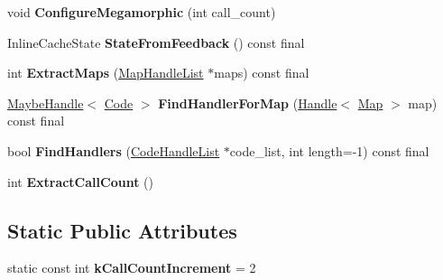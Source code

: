 \begin{DoxyCompactItemize}
\item 
void {\bfseries Configure\+Megamorphic} (int call\+\_\+count)\hypertarget{classv8_1_1internal_1_1_call_i_c_nexus_af9b256e019caf4a405ef70cb27cb5c15}{}\label{classv8_1_1internal_1_1_call_i_c_nexus_af9b256e019caf4a405ef70cb27cb5c15}

\item 
Inline\+Cache\+State {\bfseries State\+From\+Feedback} () const  final\hypertarget{classv8_1_1internal_1_1_call_i_c_nexus_ad3475d632b79276ed1a408a57fc7f2ab}{}\label{classv8_1_1internal_1_1_call_i_c_nexus_ad3475d632b79276ed1a408a57fc7f2ab}

\item 
int {\bfseries Extract\+Maps} (\hyperlink{classv8_1_1internal_1_1_list}{Map\+Handle\+List} $\ast$maps) const  final\hypertarget{classv8_1_1internal_1_1_call_i_c_nexus_aba1dd8999ca0e6ec930b34c81f280efa}{}\label{classv8_1_1internal_1_1_call_i_c_nexus_aba1dd8999ca0e6ec930b34c81f280efa}

\item 
\hyperlink{classv8_1_1internal_1_1_maybe_handle}{Maybe\+Handle}$<$ \hyperlink{classv8_1_1internal_1_1_code}{Code} $>$ {\bfseries Find\+Handler\+For\+Map} (\hyperlink{classv8_1_1internal_1_1_handle}{Handle}$<$ \hyperlink{classv8_1_1internal_1_1_map}{Map} $>$ map) const  final\hypertarget{classv8_1_1internal_1_1_call_i_c_nexus_ac27374ac0642b1400c15e3bcd91e839c}{}\label{classv8_1_1internal_1_1_call_i_c_nexus_ac27374ac0642b1400c15e3bcd91e839c}

\item 
bool {\bfseries Find\+Handlers} (\hyperlink{classv8_1_1internal_1_1_list}{Code\+Handle\+List} $\ast$code\+\_\+list, int length=-\/1) const  final\hypertarget{classv8_1_1internal_1_1_call_i_c_nexus_abb114a024580efb74f6079d648dd5f8b}{}\label{classv8_1_1internal_1_1_call_i_c_nexus_abb114a024580efb74f6079d648dd5f8b}

\item 
int {\bfseries Extract\+Call\+Count} ()\hypertarget{classv8_1_1internal_1_1_call_i_c_nexus_ad44489e1cfc012b8261810721c4a0769}{}\label{classv8_1_1internal_1_1_call_i_c_nexus_ad44489e1cfc012b8261810721c4a0769}

\end{DoxyCompactItemize}
\subsection*{Static Public Attributes}
\begin{DoxyCompactItemize}
\item 
static const int {\bfseries k\+Call\+Count\+Increment} = 2\hypertarget{classv8_1_1internal_1_1_call_i_c_nexus_a4ae3ca9015a6aa3c2c653193eac81964}{}\label{classv8_1_1internal_1_1_call_i_c_nexus_a4ae3ca9015a6aa3c2c653193eac81964}

\end{DoxyCompactItemize}
